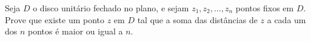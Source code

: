 Seja \(D\) o disco unitário fechado no plano, e sejam \(z_1,z_2,\ldots,z_n\) pontos fixos em \(D\). Prove que existe um ponto \(z\) em \(D\) tal que a soma das distâncias de \(z\) a cada um dos \(n\) pontos é maior ou igual a \(n\).
